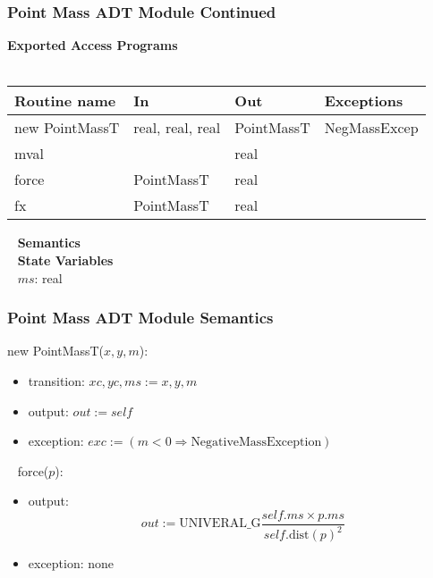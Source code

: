 \documentclass[t,12pt,numbers,fleqn,handout]{beamer}
\begin{document}
\begin{frame}
\frametitle{Point Mass ADT Module Continued}

\textbf{Exported Access Programs}\\
~\newline
\begin{tabular}{| l | l | l | l |}
\hline
\textbf{Routine name} & \textbf{In} & \textbf{Out} & \textbf{Exceptions}\\
\hline
new PointMassT & real, real, real & PointMassT & NegMassExcep\\
\hline
mval & ~ & real & ~\\
\hline 
force & PointMassT & real & ~\\
\hline
fx & PointMassT & real & ~\\
\hline
\end{tabular}

~\newline
\textbf{Semantics}\\
~\newline
\textbf{State Variables}\\
~\newline
$ms$: real

\end{frame}


\begin{frame}
\frametitle{Point Mass ADT Module Semantics}

\noindent new PointMassT($x, y, m$):
\begin{itemize}
\item transition: $xc, yc, ms := x, y, m$
\item output: $out := \mathit{self}$
\item exception: $exc := (m < 0 \Rightarrow \mbox{NegativeMassException})$
\end{itemize}
~\newline
\noindent force($p$):
\begin{itemize}
\item output: $$out := \mathrm{UNIVERAL\_G} \frac{\mathit{self}.ms \times p.ms}
{\mathit{self}.\mathrm{dist}(p)^2}$$
\item exception: none
\end{itemize}

\end{frame}

\end{document}
